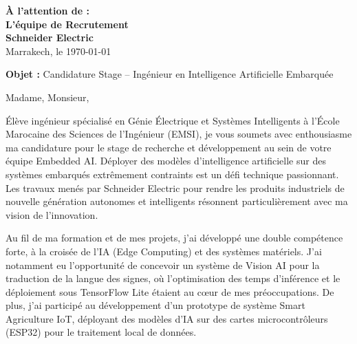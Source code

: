 \documentclass[10pt,a4paper]{../../templates/altacv}
\makeatletter
\renewcommand{\makecvheader}{%
  \begingroup
    \raggedright\color{emphasis}%
    {\Huge\bfseries\MakeUppercase{\@name}\par}
    \medskip
    {\large\bfseries\color{accent}\@tagline\par}
    \medskip
    {\footnotesize\bfseries\@personalinfo\par}
  \endgroup\medskip
}
\makeatother
\begin{document}

\makecvheader

\bigskip
\medskip

\begin{flushright}
  {\color{emphasis}\textbf{À l'attention de :}} \\[2pt]
  \textbf{L'équipe de Recrutement} \\
  \textbf{Schneider Electric} \\[20pt]
  Marrakech, le \today
\end{flushright}
\bigskip

\bigskip

{\color{accent}\textbf{Objet :}} Candidature Stage -- Ingénieur en Intelligence Artificielle Embarquée

\bigskip\bigskip

Madame, Monsieur,

\vspace{0.4cm}

Élève ingénieur spécialisé en Génie Électrique et Systèmes Intelligents à l'École Marocaine des Sciences de l'Ingénieur (EMSI), je vous soumets avec enthousiasme ma candidature pour le stage de recherche et développement au sein de votre équipe Embedded AI. Déployer des modèles d'intelligence artificielle sur des systèmes embarqués extrêmement contraints est un défi technique passionnant. Les travaux menés par Schneider Electric pour rendre les produits industriels de nouvelle génération autonomes et intelligents résonnent particulièrement avec ma vision de l'innovation.

\vspace{0.4cm}

Au fil de ma formation et de mes projets, j'ai développé une double compétence forte, à la croisée de l'IA (Edge Computing) et des systèmes matériels. J'ai notamment eu l'opportunité de concevoir un système de Vision AI pour la traduction de la langue des signes, où l'optimisation des temps d'inférence et le déploiement sous TensorFlow Lite étaient au cœur de mes préoccupations. De plus, j'ai participé au développement d'un prototype de système Smart Agriculture IoT, déployant des modèles d'IA sur des cartes microcontrôleurs (ESP32) pour le traitement local de données.
\end{document}
